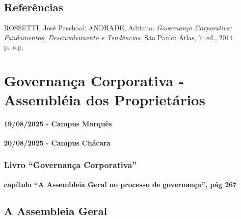 \documentclass[
]{book}
\begin{document}
\section{Referências}\label{referuxeancias}

ROSSETTI, José Paschoal; ANDRADE, Adriana. \emph{Governança Corporativa: Fundamentos, Desenvolvimento e Tendências}. São Paulo: Atlas, 7. ed., 2014. p.~s.p.

\chapter{Governança Corporativa - Assembléia dos Proprietários}\label{governanuxe7a-corporativa---assembluxe9ia-dos-proprietuxe1rios}

\subsubsection*{19/08/2025 - Campus Marquês}\label{campus-marquuxeas-2}

\subsubsection*{20/08/2025 - Campus Chácara}\label{campus-chuxe1cara-2}

\subsection{Livro ``Governança Corporativa''}\label{livro-governanuxe7a-corporativa}

\subsubsection{capítulo ``A Assembleia Geral no processo de governança'', pág 267}\label{capuxedtulo-a-assembleia-geral-no-processo-de-governanuxe7a-puxe1g-267}

\section{\texorpdfstring{\textbf{A Assembleia Geral}}{A Assembleia Geral}}\label{a-assembleia-geral}
\end{document}
